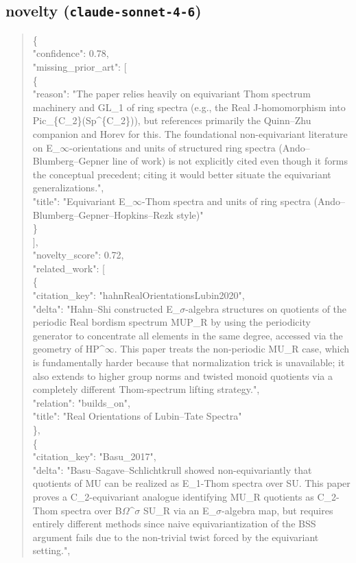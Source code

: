 \documentclass[11pt]{article}
\begin{document}
\subsection*{novelty (\texttt{claude-sonnet-4-6})}
\begin{quote}\small\ttfamily\raggedright
\{\\
  "confidence": 0.78,\\
  "missing\_prior\_art": [\\
    \{\\
      "reason": "The paper relies heavily on equivariant Thom spectrum machinery and GL\_1 of ring spectra (e.g., the Real J-homomorphism into Pic\_\{C\_2\}(Sp\^{}\{C\_2\})), but references primarily the Quinn--Zhu companion and Horev for this. The foundational non-equivariant literature on E\_\ensuremath{\infty}-orientations and units of structured ring spectra (Ando--Blumberg--Gepner line of work) is not explicitly cited even though it forms the conceptual precedent; citing it would better situate the equivariant generalizations.",\\
      "title": "Equivariant E\_\ensuremath{\infty}-Thom spectra and units of ring spectra (Ando--Blumberg--Gepner--Hopkins--Rezk style)"\\
    \}\\
  ],\\
  "novelty\_score": 0.72,\\
  "related\_work": [\\
    \{\\
      "citation\_key": "hahnRealOrientationsLubin2020",\\
      "delta": "Hahn--Shi constructed E\_\ensuremath{\sigma}-algebra structures on quotients of the periodic Real bordism spectrum MUP\_R by using the periodicity generator to concentrate all elements in the same degree, accessed via the geometry of HP\^{}\ensuremath{\infty}. This paper treats the non-periodic MU\_R case, which is fundamentally harder because that normalization trick is unavailable; it also extends to higher group norms and twisted monoid quotients via a completely different Thom-spectrum lifting strategy.",\\
      "relation": "builds\_on",\\
      "title": "Real Orientations of Lubin--Tate Spectra"\\
    \},\\
    \{\\
      "citation\_key": "Basu\_2017",\\
      "delta": "Basu--Sagave--Schlichtkrull showed non-equivariantly that quotients of MU can be realized as E\_1-Thom spectra over SU. This paper proves a C\_2-equivariant analogue identifying MU\_R quotients as C\_2-Thom spectra over B\ensuremath{\Omega}\^{}\ensuremath{\sigma} SU\_R via an E\_\ensuremath{\sigma}-algebra map, but requires entirely different methods since naive equivariantization of the BSS argument fails due to the non-trivial twist forced by the equivariant setting.",\\

\end{quote}
\end{document}
